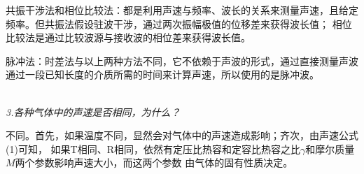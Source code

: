 \documentclass[UTF8]{ctexart}
\begin{document}
    共振干涉法和相位比较法：都是利用声速与频率、波长的关系来测量声速，且给定频率。但共振法假设驻波干涉，通过两次振幅极值的位移差来获得波长值；
    相位比较法是通过比较波源与接收波的相位差来获得波长值。

    脉冲法：时差法与以上两种方法不同，它不依赖于声波的形式，通过直接测量声波通过一段已知长度的介质所需的时间来计算声速，所以使用的是脉冲波。

    \emph{\\[0.2cm]3.各种气体中的声速是否相同，为什么？}

    不同。首先，如果温度不同，显然会对气体中的声速造成影响；齐次，由声速公式(1)可知，
    如果T相同、R相同，依然有定压比热容和定容比热容之比$\gamma $和摩尔质量$M$两个参数影响声速大小，而这两个参数
    由气体的固有性质决定。
    
    \nocite{dawushiyan}
    \nocite{shiyanjiaocheng}
    \nocite{jiangyi}
    
\end{document}
